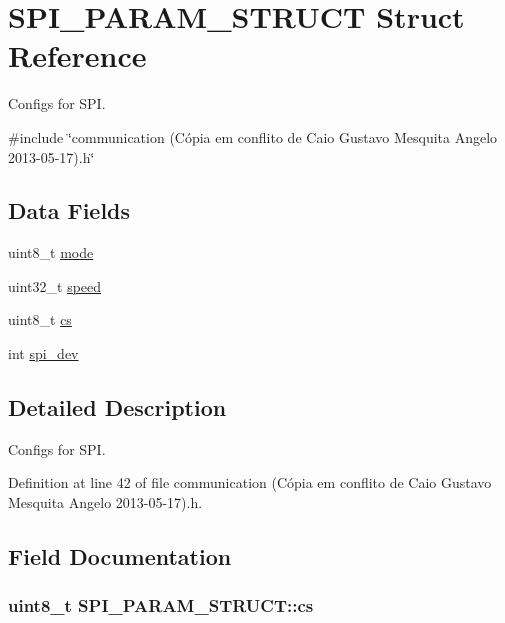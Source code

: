 \hypertarget{structSPI__PARAM__STRUCT}{\section{S\-P\-I\-\_\-\-P\-A\-R\-A\-M\-\_\-\-S\-T\-R\-U\-C\-T Struct Reference}
\label{structSPI__PARAM__STRUCT}
}


Configs for S\-P\-I.  




{\ttfamily \#include \char`\"{}communication (\-Cópia em conflito de Caio Gustavo Mesquita Angelo 2013-\/05-\/17).\-h\char`\"{}}

\subsection*{Data Fields}
\begin{DoxyCompactItemize}
\item 
uint8\-\_\-t \hyperlink{structSPI__PARAM__STRUCT_a82c546c99f6c3daed73c1e23426be847}{mode}
\item 
uint32\-\_\-t \hyperlink{structSPI__PARAM__STRUCT_a53a8d386594a81eb9bc6f971bfe36c54}{speed}
\item 
uint8\-\_\-t \hyperlink{structSPI__PARAM__STRUCT_ae0d62e0a5554783d710b677a017e246f}{cs}
\item 
int \hyperlink{structSPI__PARAM__STRUCT_abe385c44333d268d17cf648c8e371cad}{spi\-\_\-dev}
\end{DoxyCompactItemize}


\subsection{Detailed Description}
Configs for S\-P\-I. 

Definition at line 42 of file communication (\-Cópia em conflito de Caio Gustavo Mesquita Angelo 2013-\/05-\/17).\-h.



\subsection{Field Documentation}
\hypertarget{structSPI__PARAM__STRUCT_ae0d62e0a5554783d710b677a017e246f}{
\subsubsection[{cs}]{\setlength{\rightskip}{0pt plus 5cm}uint8\-\_\-t S\-P\-I\-\_\-\-P\-A\-R\-A\-M\-\_\-\-S\-T\-R\-U\-C\-T\-::cs}}\label{structSPI__PARAM__STRUCT_ae0d62e0a5554783d710b677a017e246f}



